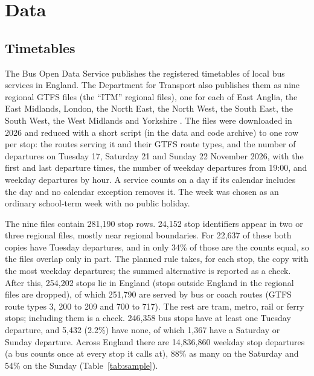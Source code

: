 \documentclass[11pt,a4paper]{article}
\begin{document}
\section{Data}\label{sec:data}
\subsection{Timetables}
The Bus Open Data Service publishes the registered timetables of local bus services in England. The Department for Transport also publishes them as nine regional GTFS files (the ``ITM'' regional files), one for each of East Anglia, the East Midlands, London, the North East, the North West, the South East, the South West, the West Midlands and Yorkshire \citep{bods2026}. The files were downloaded in 2026 and reduced with a short script (in the data and code archive) to one row per stop: the routes serving it and their GTFS route types, and the number of departures on Tuesday 17, Saturday 21 and Sunday 22 November 2026, with the first and last departure times, the number of weekday departures from 19:00, and weekday departures by hour. A service counts on a day if its calendar includes the day and no calendar exception removes it. The week was chosen as an ordinary school-term week with no public holiday.

The nine files contain 281,190 stop rows. 24,152 stop identifiers appear in two or three regional files, mostly near regional boundaries. For 22,637 of these both copies have Tuesday departures, and in only 34\% of those are the counts equal, so the files overlap only in part. The planned rule takes, for each stop, the copy with the most weekday departures; the summed alternative is reported as a check. After this, 254,202 stops lie in England (stops outside England in the regional files are dropped), of which 251,790 are served by bus or coach routes (GTFS route types 3, 200 to 209 and 700 to 717). The rest are tram, metro, rail or ferry stops; including them is a check. 246,358 bus stops have at least one Tuesday departure, and 5,432 (2.2\%) have none, of which 1,367 have a Saturday or Sunday departure. Across England there are 14,836,860 weekday stop departures (a bus counts once at every stop it calls at), 88\% as many on the Saturday and 54\% on the Sunday (Table~\ref{tab:sample}).
\end{document}
